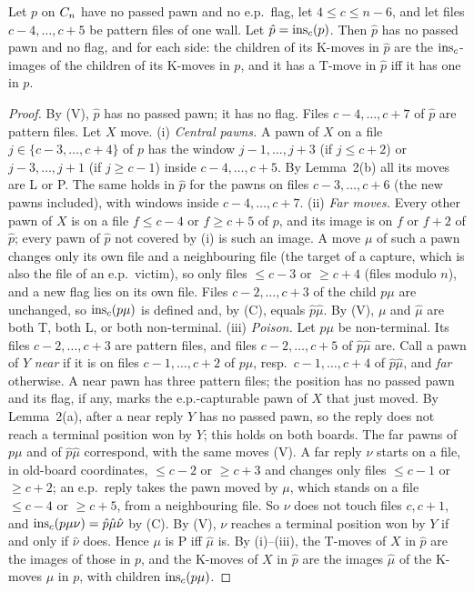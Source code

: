 \begin{wallproof}
\begin{lemma}
Let $p$ on $C_{n}$ have no passed pawn and no e.p.\ flag, let $4\le c\le n-6$, and let files $c-4,\dots,c+5$ be pattern files of one
wall. Let $\hat p=\operatorname{ins}_c(p)$. Then $\hat p$ has no passed pawn and no flag, and for each side: the children of its K-moves in $\hat p$ are
the $\operatorname{ins}_c$-images of the children of its K-moves in $p$, and it has a T-move in $\hat p$ iff it has one in $p$.
\end{lemma}
\begin{proof}
By (V), $\hat p$ has no passed pawn; it has no flag. Files $c-4,\dots,c+7$ of $\hat p$ are pattern files. Let $X$ move.
(i) \emph{Central pawns.} A pawn of $X$ on a file $j\in\{c-3,\dots,c+4\}$ of $p$ has the window $j-1,\dots,j+3$ (if $j\le c+2$) or
$j-3,\dots,j+1$ (if $j\ge c-1$) inside $c-4,\dots,c+5$. By Lemma~2(b) all its moves are L or P. The same holds in $\hat p$ for the pawns on
files $c-3,\dots,c+6$ (the new pawns included), with windows inside $c-4,\dots,c+7$.
(ii) \emph{Far moves.} Every other pawn of $X$ is on a file $f\le c-4$ or $f\ge c+5$ of $p$, and its image is on $f$ or $f+2$ of $\hat p$;
every pawn of $\hat p$ not covered by (i) is such an image. A move $\mu$ of such a pawn changes only its own file and a neighbouring
file (the target of a capture, which is also the file of an e.p.\ victim), so only files $\le c-3$ or $\ge c+4$ (files modulo $n$), and a new
flag lies on its own file. Files $c-2,\dots,c+3$ of the child $p\mu$ are unchanged, so $\operatorname{ins}_c(p\mu)$ is defined and, by (C), equals $\hat p\hat\mu$.
By (V), $\mu$ and $\hat\mu$ are both T, both L, or both non-terminal.
(iii) \emph{Poison.} Let $p\mu$ be non-terminal. Its files $c-2,\dots,c+3$ are pattern files, and files $c-2,\dots,c+5$ of $\hat p\hat\mu$ are.
Call a pawn of $Y$ \emph{near} if it is on files $c-1,\dots,c+2$ of $p\mu$, resp.\ $c-1,\dots,c+4$ of $\hat p\hat\mu$, and \emph{far} otherwise.
A near pawn has three pattern files; the position has no passed pawn and its flag, if any, marks the e.p.-capturable pawn of $X$ that just moved. By
Lemma~2(a), after a near reply $Y$ has no passed pawn, so the reply does not reach a terminal position won by $Y$; this holds on both boards.
The far pawns of $p\mu$ and of $\hat p\hat\mu$ correspond, with the same moves (V). A far reply $\nu$ starts on a file, in old-board coordinates, $\le c-2$ or $\ge c+3$
and changes only files $\le c-1$ or $\ge c+2$; an e.p.\ reply takes the pawn moved by $\mu$, which stands on a file $\le c-4$ or
$\ge c+5$, from a neighbouring file. So $\nu$ does not touch files $c,c+1$, and $\operatorname{ins}_c(p\mu\nu)=\hat p\hat\mu\hat\nu$ by (C). By (V),
$\nu$ reaches a terminal position won by $Y$ if and only if $\hat\nu$ does. Hence $\mu$ is P iff $\hat\mu$ is.
By (i)--(iii), the T-moves of $X$ in $\hat p$ are the images of those in $p$, and the K-moves of $X$ in $\hat p$ are the images $\hat\mu$ of
the K-moves $\mu$ in $p$, with children $\operatorname{ins}_c(p\mu)$.
\end{proof}


\end{wallproof}
